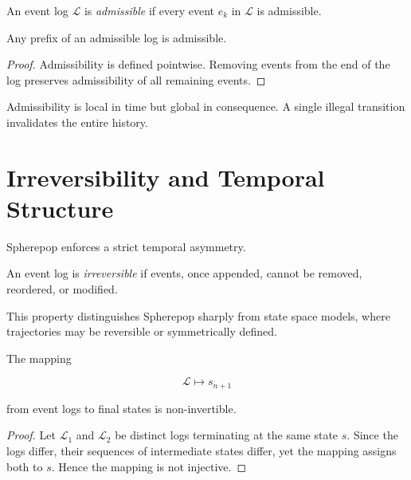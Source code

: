 \documentclass[11pt,openany]{book}
\begin{document}
\begin{definition}
An event log $\mathcal{L}$ is \emph{admissible} if every
event $e_k$ in $\mathcal{L}$ is admissible.
\end{definition}

\begin{proposition}
Any prefix of an admissible log is admissible.
\end{proposition}

\begin{proof}
Admissibility is defined pointwise. Removing events from the
end of the log preserves admissibility of all remaining
events.
\end{proof}

\begin{remark}
Admissibility is local in time but global in consequence.
A single illegal transition invalidates the entire history.
\end{remark}

\section{Irreversibility and Temporal Structure}
\label{sec:irreversibility}

Spherepop enforces a strict temporal asymmetry.

\begin{definition}
An event log is \emph{irreversible} if events, once appended,
cannot be removed, reordered, or modified.
\end{definition}

This property distinguishes Spherepop sharply from state
space models, where trajectories may be reversible or
symmetrically defined.

\begin{proposition}
\label{prop:noninvertible-log}
The mapping

$$
\mathcal{L} \mapsto s_{n+1}
$$

from event logs to final states is non-invertible.
\end{proposition}

\begin{proof}
Let $\mathcal{L}_1$ and $\mathcal{L}_2$ be distinct logs
terminating at the same state $s$. Since the logs differ,
their sequences of intermediate states differ, yet the
mapping assigns both to $s$. Hence the mapping is not
injective.
\end{proof}
\end{document}
